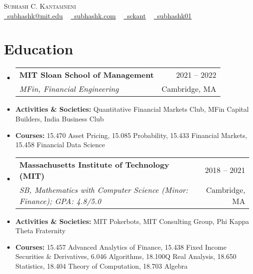 \documentclass[letterpaper,11pt]{article}
\makeatletter
\newcommand{\resumeSubheading}[4]{
  \vspace{-2pt}\item
    \begin{tabular*}{1.0\textwidth}[t]{l@{\extracolsep{\fill}}r}
      \textbf{#1} & {\small #2} \\
      \textit{\small#3} & {\small #4} \\
    \end{tabular*}\vspace{-7pt}
}
\newcommand{\resumeSubHeadingListStart}{\begin{itemize}[leftmargin=0.0in, label={}]}
\newcommand{\resumeSubHeadingListEnd}{\end{itemize}}
\makeatother
\begin{document}
\begin{center}
    {\Huge \scshape Subhash C. Kantamneni} \\ \vspace{1pt}
    \small \href{mailto:subhashk@mit.edu}{\raisebox{-0.2\height}\faEnvelope\  \underline{subhashk@mit.edu}} ~
    \href{https://subhashk.com/}{\raisebox{-0.2\height}\faBookmark\ \underline{subhashk.com}}  ~
    \href{https://subhashk.com/}{\raisebox{-0.2\height}\faLinkedin\ \underline{sckant}}  ~
    \href{https://github.com/subhashk0}{\raisebox{-0.2\height}\faGithub\ \underline{subhashk01}}
    \vspace{-8pt}
\end{center}

\section{Education}
  \resumeSubHeadingListStart
    \resumeSubheading
      {MIT Sloan School of Management}{2021 -- 2022}
      {MFin, Financial Engineering}{Cambridge, MA}
  \resumeSubHeadingListEnd
  \begin{itemize}
    \itemsep-5pt
    \item \textbf{Activities \& Societies:} Quantitative Financial Markets Club, MFin Capital Builders, India Business Club
    \item \textbf{Courses:} 15.470 Asset Pricing, 15.085 Probability, 15.433 Financial Markets, 15.458 Financial Data Science
  \end{itemize}

\vspace{-16pt}

  \resumeSubHeadingListStart
    \resumeSubheading
	  {Massachusetts Institute of Technology (MIT)}{2018 -- 2021}
	  {SB, Mathematics with Computer Science (Minor: Finance); GPA: 4.8/5.0}{Cambridge, MA}
	\resumeSubHeadingListEnd
	\begin{itemize}[noitemsep]
		\item \textbf{Activities \& Societies:} MIT Pokerbots, MIT Consulting Group, Phi Kappa Theta Fraternity
		\item \textbf{Courses:} 15.457 Advanced Analytics of Finance, 15.438 Fixed Income Securities \& Derivatives, 6.046 Algorithms, 18.100Q Real Analysis, 18.650 Statistics, 18.404 Theory of Computation, 18.703 Algebra
	\end{itemize}

\vspace{-16pt}
\end{document}
